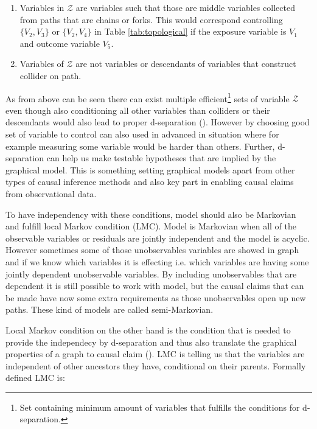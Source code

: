 \documentclass[main=english,12pt,a4paper,pdftex,econ,utf8]{aaltothesis}
\newcommand{\z}{\mathcal{Z}}
\begin{document}
\begin{enumerate}
    \item Variables in $\z$ are variables such that those are middle variables collected from paths that are chains or forks. This would correspond controlling $\{V_{2},V_{3}\}$ or $\{V_{2},V_{4}\}$ in Table \ref{tab:topological} if the exposure variable is $V_{1}$ and outcome variable $V_{5}$.
    \item Variables of $\z$ are not variables or descendants of variables that construct collider on path.
\end{enumerate}

As from above can be seen there can exist multiple efficient{\hypersetup{linkcolor=black}\footnote{Set containing minimum amount of variables that fulfills the conditions for d-separation.}} sets of variable $\z$ even though also conditioning all other variables than colliders or their descendants would also lead to proper d-separation (\cite{Pearl2016}). However by choosing good set of variable to control can also used in advanced in situation where for example measuring some variable would be harder than others. Further, d-separation can help us make testable hypotheses that are implied by the graphical model. This is something setting graphical models apart from other types of causal inference methods and also key part in enabling causal claims from observational data.



To have independency with these conditions, model should also be Markovian and fulfill local Markov condition (LMC). Model is Markovian when all of the observable variables or residuals are jointly independent and the model is acyclic. However sometimes some of those unobservables variables are showed in graph and if we know which variables it is effecting i.e. which variables are having some jointly dependent unobservable variables. By including unobservables that are dependent it is still possible to work with model, but the causal claims that can be made have now some extra requirements as those unobservables open up new paths. These kind of models are called semi-Markovian.

Local Markov condition on the other hand is the condition that is needed to provide the independecy by d-separation and thus also translate the graphical properties of a graph to causal claim (\cite{Heckman2015}). LMC is telling us that the variables are independent of other ancestors they have, conditional on their parents. Formally defined LMC is:
\end{document}

